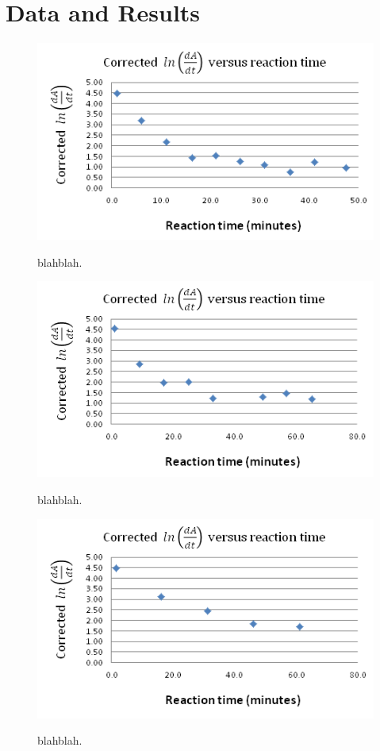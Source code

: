 \section{Data and Results}

\begin{figure}[h]
  \includegraphics[scale=0.5]{./Figures/20M_dipic_readings.png}\\
  \caption{blahblah.}\label{fig:0.20M_dipic_readings}
\end{figure}

\begin{figure}[h]
  \includegraphics[scale=0.5]{./Figures/10M_dipic_readings.png}\\
  \caption{blahblah.}\label{fig:0.10M_dipic_readings}
\end{figure}

\begin{figure}[h]
  \includegraphics[scale=0.5]{./Figures/05M_dipic_readings.png}\\
  \caption{blahblah.}\label{fig:0.05M_dipic_readings}
\end{figure}

